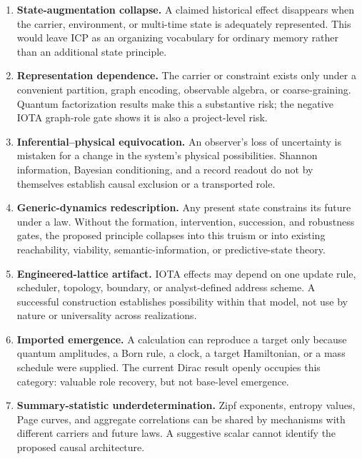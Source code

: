 \begin{enumerate}
  \item \textbf{State-augmentation collapse.} A claimed historical effect
  disappears when the carrier, environment, or multi-time state is adequately
  represented. This would leave ICP as an organizing vocabulary for ordinary
  memory rather than an additional state principle.

  \item \textbf{Representation dependence.} The carrier or constraint exists
  only under a convenient partition, graph encoding, observable algebra, or
  coarse-graining. Quantum factorization results make this a substantive risk;
  the negative IOTA graph-role gate shows it is also a project-level risk.

  \item \textbf{Inferential--physical equivocation.} An observer's loss of
  uncertainty is mistaken for a change in the system's physical possibilities.
  Shannon information, Bayesian conditioning, and a record readout do not by
  themselves establish causal exclusion or a transported role.

  \item \textbf{Generic-dynamics redescription.} Any present state constrains
  its future under a law. Without the formation, intervention, succession, and
  robustness gates, the proposed principle collapses into this truism or into
  existing reachability, viability, semantic-information, or predictive-state
  theory.

  \item \textbf{Engineered-lattice artifact.} IOTA effects may depend on one
  update rule, scheduler, topology, boundary, or analyst-defined address
  scheme. A successful construction establishes possibility within that model,
  not use by nature or universality across realizations.

  \item \textbf{Imported emergence.} A calculation can reproduce a target
  only because quantum amplitudes, a Born rule, a clock, a target Hamiltonian,
  or a mass schedule were supplied. The current Dirac result openly occupies
  this category: valuable role recovery, but not base-level emergence.

  \item \textbf{Summary-statistic underdetermination.} Zipf exponents, entropy
  values, Page curves, and aggregate correlations can be shared by mechanisms
  with different carriers and future laws. A suggestive scalar cannot identify
  the proposed causal architecture.


\end{enumerate}
